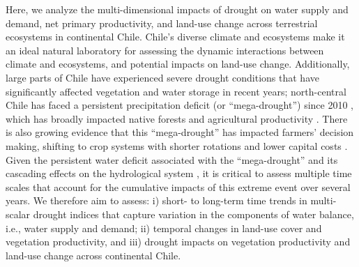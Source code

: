 \documentclass[
  sn-nature,
  numbered]{sn-jnl}
\begin{document}
Here, we analyze the multi-dimensional impacts of drought on water
supply and demand, net primary productivity, and land-use change across
terrestrial ecosystems in continental Chile. Chile's diverse climate and
ecosystems \citep{Beck2023, Luebert2022} make it an ideal natural
laboratory for assessing the dynamic interactions between climate and
ecosystems, and potential impacts on land-use change. Additionally,
large parts of Chile have experienced severe drought conditions that
have significantly affected vegetation and water storage in recent
years; north-central Chile has faced a persistent precipitation deficit
(or ``mega-drought'') since 2010 \citep{Garreaud2017}, which has broadly
impacted native forests
\citep[e.g.,][]{Miranda2020, UrrutiaJalabert2018, Venegas2018} and
agricultural productivity
\citep[e.g.,][]{Zambrano2016, Zambrano2018, Zambrano2023}. There is also
growing evidence that this ``mega-drought'' has impacted farmers'
decision making, shifting to crop systems with shorter rotations and
lower capital costs \citep{Zuniga2021}. Given the persistent water
deficit associated with the ``mega-drought'' and its cascading effects
on the hydrological system \citep{Boisier2018}, it is critical to assess
multiple time scales that account for the cumulative impacts of this
extreme event over several years. We therefore aim to assess: i) short-
to long-term time trends in multi-scalar drought indices that capture
variation in the components of water balance, i.e., water supply and
demand; ii) temporal changes in land-use cover and vegetation
productivity, and iii) drought impacts on vegetation productivity and
land-use change across continental Chile.
\end{document}
